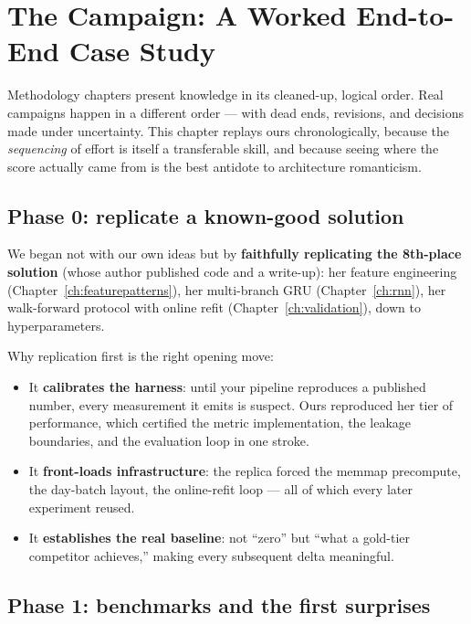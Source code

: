 \chapter{The Campaign: A Worked End-to-End Case Study}
\label{ch:casestudy}

Methodology chapters present knowledge in its cleaned-up, logical order.
Real campaigns happen in a different order --- with dead ends, revisions,
and decisions made under uncertainty. This chapter replays ours
chronologically, because the \emph{sequencing} of effort is itself a
transferable skill, and because seeing where the score actually came from
is the best antidote to architecture romanticism.

\section{Phase 0: replicate a known-good solution}

We began not with our own ideas but by \textbf{faithfully replicating the
8th-place solution} (whose author published code and a write-up):
her feature engineering (Chapter~\ref{ch:featurepatterns}), her
multi-branch GRU (Chapter~\ref{ch:rnn}), her walk-forward protocol with
online refit (Chapter~\ref{ch:validation}), down to hyperparameters.

Why replication first is the right opening move:

\begin{itemize}
\item It \textbf{calibrates the harness}: until your pipeline reproduces a
  published number, every measurement it emits is suspect. Ours
  reproduced her tier of performance, which certified the metric
  implementation, the leakage boundaries, and the evaluation loop in one
  stroke.
\item It \textbf{front-loads infrastructure}: the replica forced the
  memmap precompute, the day-batch layout, the online-refit loop --- all
  of which every later experiment reused.
\item It \textbf{establishes the real baseline}: not ``zero'' but ``what
  a gold-tier competitor achieves,'' making every subsequent delta
  meaningful.
\end{itemize}

\section{Phase 1: benchmarks and the first surprises}

